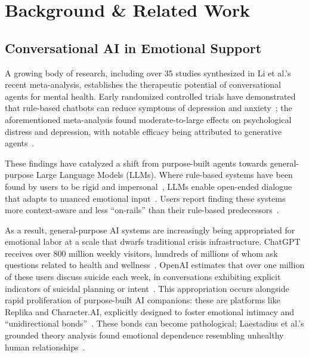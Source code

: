 \documentclass[letterpaper,twocolumn,10pt]{article}
\begin{document}
\section{Background \& Related Work}

\subsection{Conversational AI in Emotional Support}

A growing body of research, including over 35 studies synthesized in Li et al.'s recent meta-analysis, establishes the therapeutic potential of conversational agents for mental health. Early randomized controlled trials have demonstrated that rule-based chatbots can reduce symptoms of depression and anxiety~\cite{fitzpatrick2017delivering, inkster2018empathy}; the aforementioned meta-analysis found moderate-to-large effects on psychological distress and depression, with notable efficacy being attributed to generative agents~\cite{li2023systematic}.

These findings have catalyzed a shift from purpose-built agents towards general-purpose Large Language Models (LLMs). Where rule-based systems have been found by users to be rigid and impersonal~\cite{burton2016pilot, fitzpatrick2017delivering, huang2020challenges}, LLMs enable open-ended dialogue that adapts to nuanced emotional input~\cite{kirk2024benefits, ma2023understanding}. Users report finding these systems more context-aware and less ``on-rails'' than their rule-based predecessors~\cite{song2024typing, sharma2023cognitive}. 

As a result, general-purpose AI systems are increasingly being appropriated for emotional labor at a scale that dwarfs traditional crisis infrastructure. ChatGPT receives over 800 million weekly visitors, hundreds of millions of whom ask questions related to health and wellness~\cite{openai2026health, fortune2026health}. OpenAI estimates that over one million of these users discuss suicide each week, in conversations exhibiting explicit indicators of suicidal planning or intent~\cite{techcrunch2025suicide}. This appropriation occurs alongside rapid proliferation of purpose-built AI companions: these are platforms like Replika and Character.AI, explicitly designed to foster emotional intimacy and ``unidirectional bonds''~\cite{skjuve2021my, pentina2023exploring}. These bonds can become pathological; Laestadius et al.'s grounded theory analysis found emotional dependence resembling unhealthy human relationships~\cite{laestadius2024too}.
\end{document}
